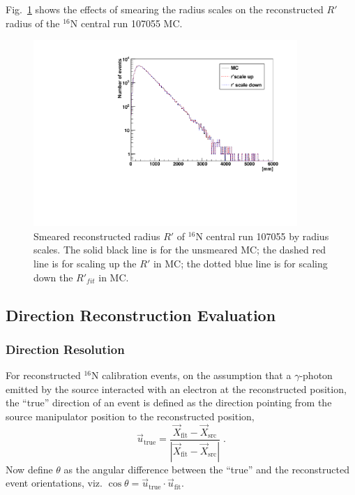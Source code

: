 Fig.~\ref{fig:RscaleSmear} shows the effects of smearing the radius scales on the reconstructed $R'$ radius of the $^{16}$N central run 107055 MC. 

\begin{figure}
	\centering
	\includegraphics[width=10cm]{smearRadResol.pdf}
	\caption[Smeared reconstructed radius $R'$ spectrum of $^{16}$N central run 107055 MC by radius scales.]{Smeared reconstructed radius $R'$ of $^{16}$N central run 107055 by radius scales. The solid black line is for the unsmeared MC; the dashed red line is for scaling up the $R'$ in MC; the dotted blue line is for scaling down the $R'_{fit}$ in MC.\label{fig:RscaleSmear}}
\end{figure} 


\subsection{Direction Reconstruction Evaluation}

\subsubsection{Direction Resolution}

For reconstructed $^{16}$N calibration events, on the assumption that a $\gamma$-photon emitted by the source interacted with an electron at the reconstructed position, the ``true'' direction of an event is defined as the direction pointing from the source manipulator position to the reconstructed position,
\begin{equation}
\vec{u}_{\mathrm{true}} = \frac{\vec{X}_{\mathrm{fit}}-\vec{X}_{\mathrm{src}}}{|\vec{X}_{\mathrm{fit}}-\vec{X}_\mathrm{src}|} \; .
\end{equation}
Now define $\theta$ as the angular difference between the ``true'' and the reconstructed event orientations, viz. $\cos\theta= \vec{u}_{\mathrm{true}} \cdot \vec{u}_{\mathrm{fit}}$.

